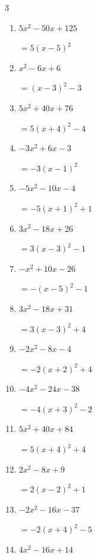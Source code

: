 \begin{multicols}{3}
\begin{enumerate}
  \item $5x^{2}-50x+125$

        $=5\left( x-5\right)^{2}$

  \item $x^{2}-6x+6$

        $=\left( x-3\right)^{2}-3$

\columnbreak %

\resetques

  \item $5x^{2}+40x+76$

        $=5\left( x+4\right)^{2}-4$

  \item $-3x^{2}+6x-3$

        $=-3\left( x-1\right)^{2}$

  \item $-5x^{2}-10x-4$

        $=-5\left( x+1\right)^{2}+1$

  \item $3x^{2}-18x+26$

        $=3\left( x-3\right)^{2}-1$

  \item $-x^{2}+10x-26$

        $=-\left( x-5\right)^{2}-1$

  \item $3x^{2}-18x+31$

        $=3\left( x-3\right)^{2}+4$

  \item $-2x^{2}-8x-4$

        $=-2\left( x+2\right)^{2}+4$

  \item $-4x^{2}-24x-38$

        $=-4\left( x+3\right)^{2}-2$

  \item $5x^{2}+40x+84$

        $=5\left( x+4\right)^{2}+4$

  \item $2x^{2}-8x+9$

        $=2\left( x-2\right)^{2}+1$

\columnbreak %

  \item $-2x^{2}-16x-37$

        $=-2\left( x+4\right)^{2}-5$

  \item $4x^{2}-16x+14$


\end{enumerate}
\end{multicols}
